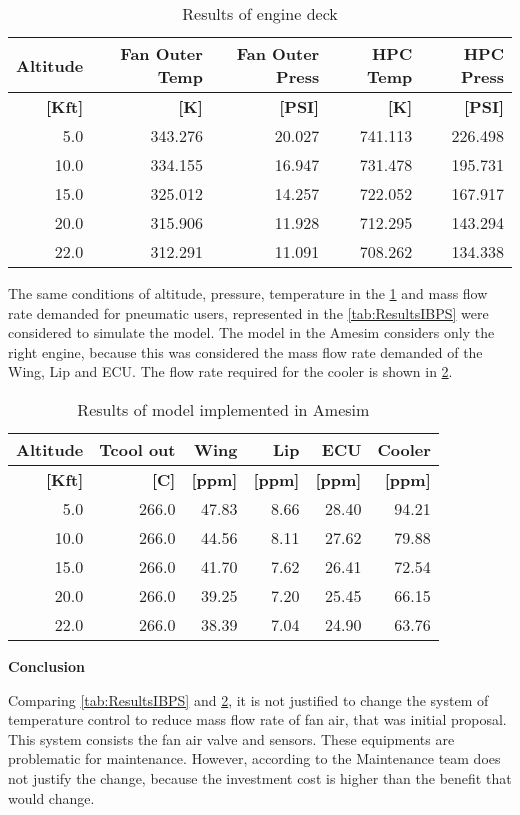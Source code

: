 \begin{table}[htbp]
  \centering
  \caption{Results of engine deck}
    \begin{tabular}{rrrrr}
    \toprule
    \textbf{Altitude} & \textbf{Fan Outer Temp} & \textbf{Fan Outer Press} & \textbf{HPC Temp} & \textbf{HPC Press} \\
    \midrule
    \textbf{[Kft]} & \textbf{[K]} & \textbf{[PSI]} & \textbf{[K]} & \textbf{[PSI]} \\
    5.0   & 343.276 & 20.027 & 741.113 & 226.498 \\
    10.0  & 334.155 & 16.947 & 731.478 & 195.731 \\
    15.0  & 325.012 & 14.257 & 722.052 & 167.917 \\
    20.0  & 315.906 & 11.928 & 712.295 & 143.294 \\
    22.0  & 312.291 & 11.091 & 708.262 & 134.338 \\
    \bottomrule
    \end{tabular}%
  \label{tab:ResultsEngine}%
\end{table}%

The same conditions of altitude, pressure, temperature  in the \ref{tab:ResultsEngine} and mass flow rate demanded for pneumatic users, represented in the \ref{tab:ResultsIBPS} were considered to simulate the model.
The model in the Amesim considers only the right engine, because this was considered the mass flow rate demanded of the Wing, Lip and ECU. The flow rate required for the cooler is shown in \ref{tab:ResultsAmesim}.

\begin{table}[htbp]
  \centering
  \caption{Results of model implemented in Amesim}
    \begin{tabular}{rrrrrr}
    \toprule
    \textbf{Altitude} & \textbf{Tcool out} & \textbf{Wing} & \textbf{Lip} & \textbf{ECU} & \textbf{Cooler} \\
    \midrule
    \textbf{[Kft]} & \textbf{[C]} & \textbf{[ppm]} & \textbf{[ppm]} & \textbf{[ppm]} & \textbf{[ppm]} \\
    5.0   & 266.0 & 47.83 & 8.66  & 28.40 & 94.21 \\
    10.0  & 266.0 & 44.56 & 8.11  & 27.62 & 79.88 \\
    15.0  & 266.0 & 41.70 & 7.62  & 26.41 & 72.54 \\
    20.0  & 266.0 & 39.25 & 7.20  & 25.45 & 66.15 \\
    22.0  & 266.0 & 38.39 & 7.04  & 24.90 & 63.76 \\
    \bottomrule
    \end{tabular}%
  \label{tab:ResultsAmesim}%
\end{table}%

\textbf{Conclusion}

Comparing \ref{tab:ResultsIBPS} and \ref{tab:ResultsAmesim}, it is not justified to change the system of temperature control to reduce mass flow rate of fan air, that was initial proposal.
This system consists the fan air valve and sensors. These equipments are problematic for maintenance. However, according to the Maintenance team does not justify the change, because the investment cost is higher than the benefit that would change.
